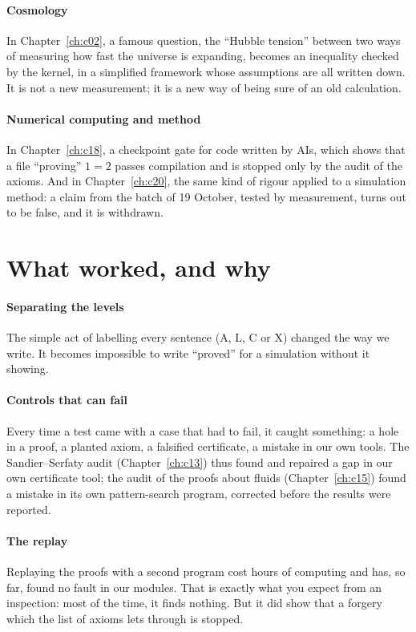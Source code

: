 \paragraph{Cosmology} In Chapter~\ref{ch:c02}, a famous question, the ``Hubble tension'' between two ways of measuring
how fast the universe is expanding, becomes an inequality checked by the kernel, in a simplified framework whose
assumptions are all written down. It is not a new measurement; it is a new way of being sure of an old calculation.

\paragraph{Numerical computing and method} In Chapter~\ref{ch:c18}, a checkpoint gate for code written by AIs, which
shows that a file ``proving'' $1=2$ passes compilation and is stopped only by the audit of the axioms. And in
Chapter~\ref{ch:c20}, the same kind of rigour applied to a simulation method: a claim from the batch of 19 October,
tested by measurement, turns out to be false, and it is withdrawn.

\section{What worked, and why}

\paragraph{Separating the levels} The simple act of labelling every sentence (A, L, C or X) changed the way we write.
It becomes impossible to write ``proved'' for a simulation without it showing.

\paragraph{Controls that can fail} Every time a test came with a case that had to fail, it caught something: a hole in
a proof, a planted axiom, a falsified certificate, a mistake in our own tools. The Sandier--Serfaty audit
(Chapter~\ref{ch:c13}) thus found and repaired a gap in our own certificate tool; the audit of the proofs about fluids
(Chapter~\ref{ch:c15}) found a mistake in its own pattern-search program, corrected before the results were reported.

\paragraph{The replay} Replaying the proofs with a second program cost hours of computing and has, so far, found no
fault in our modules. That is exactly what you expect from an inspection: most of the time, it finds nothing. But it
did show that a forgery which the list of axioms lets through is stopped.

